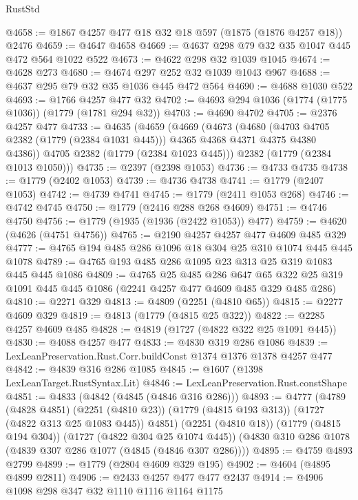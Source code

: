 \begin{lexlean}{RustStd}
\begin{coremodule}
{\begin{coremodule}
{{{{{{{{{{{@4658 := @1867 @4257 @477 @18 @32 @18 @597 (@1875 (@1876 @4257 @18)) @2476
@4659 := @4647 @4658
@4669 := @4637 @298 @79 @32 @35 @1047 @445 @472 @564 @1022 @522
@4673 := @4622 @298 @32 @1039 @1045
@4674 := @4628 @273
@4680 := @4674 @297 @252 @32 @1039 @1043 @967
@4688 := @4637 @295 @79 @32 @35 @1036 @445 @472 @564
@4690 := @4688 @1030 @522
@4693 := @1766 @4257 @477 @32
@4702 := @4693 @294 @1036 (@1774 (@1775 @1036)) (@1779 (@1781 @294 @32))
@4703 := @4690 @4702
@4705 := @2376 @4257 @477
@4733 := @4635
    (@4659
      (@4669
        (@4673
          (@4680
            (@4703 @4705 @2382 (@1779 (@2384 @1031 @445)))
            @4365
            @4368
            @4371
            @4375
            @4380
            @4386))
        @4705
        @2382
        (@1779 (@2384 @1023 @445)))
      @2382
      (@1779 (@2384 @1013 @1050)))
@4735 := @2397 (@2398 @1053)
@4736 := @4733 @4735
@4738 := @1779 (@2402 @1053)
@4739 := @4736 @4738
@4741 := @1779 (@2407 @1053)
@4742 := @4739 @4741
@4745 := @1779 (@2411 @1053 @268)
@4746 := @4742 @4745
@4750 := @1779 (@2416 @288 @268 @4609)
@4751 := @4746 @4750
@4756 := @1779 (@1935 (@1936 (@2422 @1053)) @477)
@4759 := @4620 (@4626 (@4751 @4756))
@4765 := @2190 @4257 @4257 @477 @4609 @485 @329
@4777 := @4765 @194 @485 @286 @1096 @18 @304 @25 @310 @1074 @445 @445 @1078
@4789 := @4765 @193 @485 @286 @1095 @23 @313 @25 @319 @1083 @445 @445 @1086
@4809 := @4765
    @25
    @485
    @286
    @647
    @65
    @322
    @25
    @319
    @1091
    @445
    @445
    @1086
    (@2241 @4257 @477 @4609 @485 @329 @485 @286)
@4810 := @2271 @329
@4813 := @4809 (@2251 (@4810 @65))
@4815 := @2277 @4609 @329
@4819 := @4813 (@1779 (@4815 @25 @322))
@4822 := @2285 @4257 @4609 @485
@4828 := @4819 (@1727 (@4822 @322 @25 @1091 @445))
@4830 := @4088 @4257 @477
@4833 := @4830 @319 @286 @1086
@4839 := LexLeanPreservation.Rust.Corr.buildConst @1374 @1376 @1378 @4257 @477
@4842 := @4839 @316 @286 @1085
@4845 := @1607 (@1398 LexLeanTarget.RustSyntax.Lit)
@4846 := LexLeanPreservation.Rust.constShape
@4851 := @4833 (@4842 (@4845 (@4846 @316 @286)))
@4893 := @4777
    (@4789
      (@4828 @4851)
      (@2251 (@4810 @23))
      (@1779 (@4815 @193 @313))
      (@1727 (@4822 @313 @25 @1083 @445))
      @4851)
    (@2251 (@4810 @18))
    (@1779 (@4815 @194 @304))
    (@1727 (@4822 @304 @25 @1074 @445))
    (@4830 @310 @286 @1078 (@4839 @307 @286 @1077 (@4845 (@4846 @307 @286))))
@4895 := @4759 @4893 @2799
@4899 := @1779 (@2804 @4609 @329 @195)
@4902 := @4604 (@4895 @4899 @2811)
@4906 := @2433 @4257 @477 @477 @2437
@4914 := @4906 @1098 @298 @347 @32 @1110 @1116 @1164 @1175
}}}}}}}}}}}
\end{coremodule}}
\end{coremodule}
\end{lexlean}

